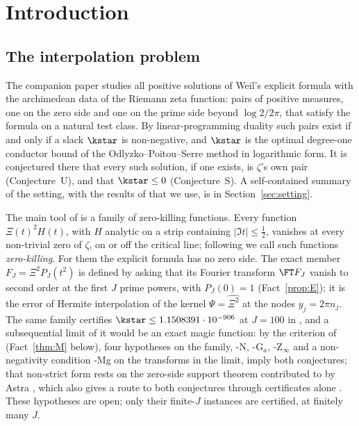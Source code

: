 \section{Introduction}\label{sec:intro}

\subsection{The interpolation problem}\label{ssec:intro-problem}

The companion paper \cite{PaperI} studies all positive solutions of Weil's explicit formula with the archimedean data of
the Riemann zeta function: pairs of positive measures, one on the zero side and one on the prime side beyond
$\log2/2\pi$, that satisfy the formula on a natural test class. By linear-programming duality such pairs exist if and only
if a slack $\kstar$ is non-negative, and $\kstar$ is the optimal degree-one conductor bound of the
Odlyzko--Poitou--Serre method in logarithmic form. It is conjectured there that every such solution, if one exists, is
$\zeta$'s own pair (Conjecture~U), and that $\kstar\le0$ (Conjecture~S). A self-contained summary of the setting, with the results of
\cite{PaperI} that we use, is in Section~\ref{sec:setting}.

The main tool of \cite{PaperI} is a family of zero-killing functions. Every function $\Xi(t)^2H(t)$, with $H$ analytic on a
strip containing $\lvert\Im t\rvert\le\frac12$, vanishes at every non-trivial zero of $\zeta$, on or off the critical line; following
\cite{PaperI} we call such functions \emph{zero-killing}. For them the explicit formula has no zero side. The exact member
$F_J=\Xi^2P_J(t^2)$ is defined by asking that its Fourier transform $\FT F_J$ vanish to second order at the first $J$ prime
powers, with $P_J(0)=1$ (Fact~\ref{prop:E}); it is the error of Hermite interpolation of the kernel $\Psi=\widehat{\Xi^2}$ at
the nodes $y_j=2\pi n_j$. The same family certifies $\kstar\le1.1508391\cdot10^{-906}$ at $J=100$ in \cite{PaperI}, and a
subsequential limit of it would be an exact magic function: by the criterion of \cite[Theorem~D]{PaperI} (Fact~\ref{thm:M} below), four
hypotheses on the family, \hyp{N}, \hyp{G$_a$}, \hyp{Z$_\infty$} and a non-negativity condition \hyp{Mg} on the transforms in
the limit, imply both conjectures; that non-strict form rests on the zero-side support theorem contributed to \cite{PaperI} by Astra
\cite[Theorem~3.6]{PaperI}, which also gives a route to both conjectures through certificates alone \cite[Corollary~4.11]{PaperI}. These hypotheses are
open; only their finite-$J$ instances are certified, at finitely many $J$.

